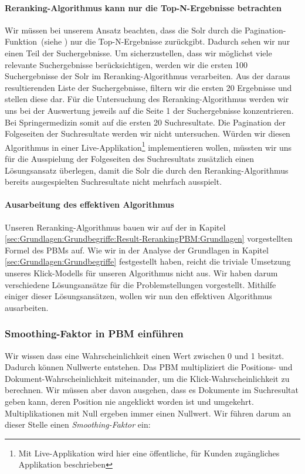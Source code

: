 \paragraph{Reranking-Algorithmus kann nur die Top-N-Ergebnisse betrachten}
Wir müssen bei unserem Ansatz beachten, dass die Solr durch die Pagination-Funktion~(siehe \cite{Pagination}) nur die Top-N-Ergebnisse zurückgibt. Dadurch sehen wir nur einen Teil der Suchergebnisse. Um sicherzustellen, dass wir möglichst viele relevante Suchergebnisse berücksichtigen, werden wir die ersten 100 Suchergebnisse der Solr im Reranking-Algorithmus verarbeiten. Aus der daraus resultierenden Liste der Suchergebnisse, filtern wir die ersten 20 Ergebnisse und stellen diese dar. Für die Untersuchung des Reranking-Algorithmus werden wir uns bei der Auswertung jeweils auf die Seite 1 der Suchergebnisse konzentrieren. Bei Springermedizin somit auf die ersten 20 Suchresultate. Die Pagination der Folgeseiten der Suchresultate werden wir nicht untersuchen. Würden wir diesen Algorithmus in einer Live-Applikation\footnote{Mit Live-Applikation wird hier eine öffentliche, für Kunden zugängliches Applikation beschrieben} implementieren wollen, müssten wir uns für die Ausspielung der Folgeseiten des Suchresultats zusätzlich einen Lösungsansatz überlegen, damit die Solr die durch den Reranking-Algorithmus bereits ausgespielten Suchresultate nicht mehrfach ausspielt.

\paragraph{Ausarbeitung des effektiven Algorithmus}
Unseren Reranking-Algorithmus bauen wir auf der in Kapitel \ref{sec:Grundlagen:Grundbegriffe:Result-RerankingPBM:Grundlagen} vorgestellten Formel des PBMs auf. Wie wir in der Analyse der Grundlagen in Kapitel \ref{sec:Grundlagen:Grundbegriffe} festgestellt haben, reicht die triviale Umsetzung unseres Klick-Modells für unseren Algorithmus nicht aus. Wir haben darum verschiedene Lösungsansätze für die Problemstellungen vorgestellt. Mithilfe einiger dieser Lösungsansätzen, wollen wir nun den effektiven Algorithmus ausarbeiten.

\subsubsection{Smoothing-Faktor in PBM einführen}
\label{sec:Reranking:Methodik:Result-RerankingPBM:SmoothingPBM}

Wir wissen dass eine Wahrscheinlichkeit einen Wert zwischen 0 und 1 besitzt. Dadurch können Nullwerte entstehen. Das PBM multipliziert die Positions- und Dokument-Wahrscheinlichkeit miteinander, um die Klick-Wahrscheinlichkeit zu berechnen. Wir müssen aber davon ausgehen, dass es Dokumente im Suchresultat geben kann, deren Position nie angeklickt worden ist und umgekehrt. Multiplikationen mit Null ergeben immer einen Nullwert.  Wir führen darum an dieser Stelle einen \textit{Smoothing-Faktor} ein:

